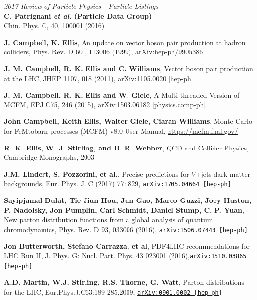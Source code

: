 \documentclass[11pt,a4paper,openright,twoside]{report}
\begin{document}
\begin{thebibliography}{9}
	\textit{2017 Review of Particle Physics - Particle Listings}\\
	\textbf{C. Patrignani \textit{et al}. (Particle Data Group)}\\
	Chin. Phys. C, 40, 100001 (2016)

\textbf{J. Campbell, K. Ellis},	An update on vector boson pair production at hadron colliders, Phys. Rev. D
60
, 113006 (1999), \href{https://arxiv.org/abs/hep-ph/9905386}{arXiv:hep-ph/9905386}

\textbf{J. M. Campbell, R. K. Ellis and C. Williams}, Vector boson pair production at the LHC, JHEP 1107, 018 (2011), \href{https://arxiv.org/abs/1105.0020}{arXiv:1105.0020 [hep-ph]}

\textbf{J. M. Campbell, R. K. Ellis and W. Giele}, A Multi-threaded Version of MCFM, EPJ C75, 246 (2015), \href{https://arxiv.org/abs/1503.06182}{arXiv:1503.06182 [physics.comp-ph]}

\textbf{John Campbell, Keith Ellis, Walter Giele, Ciaran Williams},	Monte Carlo for FeMtobarn processes (MCFM) v8.0 User Manual, \url{https://mcfm.fnal.gov/}

	\textbf{R. K. Ellis, W. J. Stirling, and B. R. Webber}, QCD and Collider Physics, Cambridge Monographs, 2003

	\textbf{J.M. Lindert, S. Pozzorini, et al.}, Precise predictions for $V$+jets dark matter backgrounds, Eur. Phys. J. C (2017) 77: 829, \href{https://arxiv.org/abs/1705.04664}{\texttt{arXiv:1705.04664 [hep-ph]}}
	
	\textbf{Sayipjamal Dulat, Tie Jiun Hou, Jun Gao, Marco Guzzi, Joey Huston, P. Nadolsky, Jon Pumplin, Carl Schmidt, Daniel Stump, C. P. Yuan}, New parton distribution functions from a global analysis of quantum chromodynamics, Phys. Rev. D 93, 033006 (2016), \href{https://arxiv.org/abs/1506.07443}{\texttt{arXiv:1506.07443 [hep-ph]}}

	\textbf{Jon Butterworth, Stefano Carrazza, et al}, PDF4LHC recommendations for LHC Run II, J. Phys. G: Nucl. Part. Phys. 43 023001 (2016),\href{https://arxiv.org/abs/1510.03865}{\texttt{arXiv:1510.03865 [hep-ph]}}

	\textbf{A.D. Martin, W.J. Stirling, R.S. Thorne, G. Watt}, Parton distributions for the LHC, Eur.Phys.J.C63:189-285,2009, \href{https://arxiv.org/abs/0901.0002}{\texttt{arXiv:0901.0002 [hep-ph]}}
	

\end{thebibliography}
\end{document}
